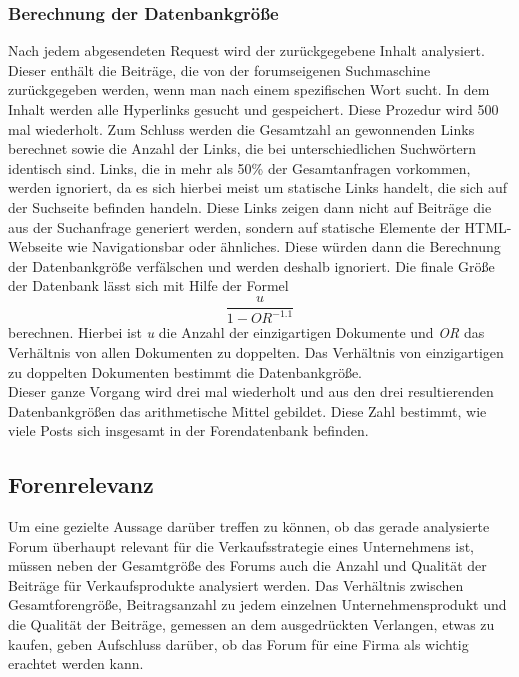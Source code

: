 \subsubsection{Berechnung der Datenbankgröße}
Nach jedem abgesendeten Request wird der zurückgegebene Inhalt analysiert. Dieser enthält die Beiträge, die von der 
forumseigenen Suchmaschine zurückgegeben werden, wenn man nach einem spezifischen Wort sucht. In dem Inhalt werden alle Hyperlinks gesucht und gespeichert. Diese Prozedur wird 500 mal wiederholt. Zum Schluss werden die Gesamtzahl an gewonnenden Links berechnet sowie die Anzahl der Links, die bei unterschiedlichen Suchwörtern identisch sind. Links, die in mehr als 50\% der Gesamtanfragen vorkommen, werden ignoriert, da es sich hierbei meist um statische Links handelt, die sich auf der Suchseite befinden handeln. Diese Links zeigen dann nicht auf Beiträge die aus der Suchanfrage generiert werden, sondern auf statische Elemente der HTML-Webseite wie Navigationsbar oder ähnliches. Diese würden dann die Berechnung der Datenbankgröße verfälschen und werden deshalb ignoriert.
Die finale Größe der Datenbank lässt sich mit Hilfe der Formel \[\frac{u}{1-OR^{-1.1}}\] \cite{lu2008efficient} berechnen. Hierbei ist \textit{u} die Anzahl der einzigartigen Dokumente und \textit{OR} das Verhältnis von allen Dokumenten zu doppelten. Das Verhältnis von einzigartigen zu doppelten Dokumenten bestimmt die Datenbankgröße.\\
Dieser ganze Vorgang wird drei mal wiederholt und aus den drei resultierenden Datenbankgrößen das arithmetische Mittel gebildet. Diese Zahl bestimmt, wie viele Posts sich insgesamt in der Forendatenbank befinden.



\subsection{Forenrelevanz}
Um eine gezielte Aussage darüber treffen zu können, ob das gerade analysierte Forum überhaupt relevant für die Verkaufsstrategie eines Unternehmens ist, müssen neben der Gesamtgröße des Forums auch die Anzahl und Qualität der Beiträge für Verkaufsprodukte analysiert werden. Das Verhältnis zwischen Gesamtforengröße, Beitragsanzahl zu jedem einzelnen Unternehmensprodukt und die Qualität der Beiträge, gemessen an dem ausgedrückten Verlangen, etwas zu kaufen, geben Aufschluss darüber, ob das Forum für eine Firma als wichtig erachtet werden kann.


